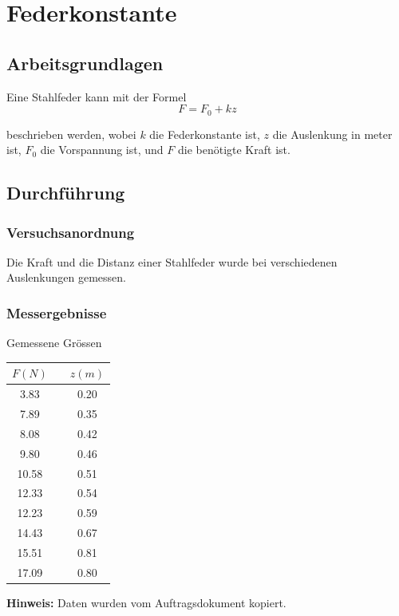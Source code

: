 \section{Federkonstante}

\subsection{Arbeitsgrundlagen}

Eine Stahlfeder kann mit der Formel
\begin{equation}
    F=F_0 + kz
    \label{eq:feder}
\end{equation}

beschrieben werden, wobei $k$ die Federkonstante ist, $z$ die Auslenkung in meter ist, $F_0$ die
Vorspannung ist, und $F$ die ben\"otigte Kraft ist.


\subsection{Durchf\"uhrung}

\subsubsection*{Versuchsanordnung}

Die Kraft und die Distanz einer Stahlfeder wurde bei verschiedenen Auslenkungen gemessen.


\subsubsection*{Messergebnisse}

\begin{center}
    \begin{threeparttable}
        \caption{Gemessene Gr\"ossen}
        \begin{tabular}{ccc}
            \toprule
            $F (N)$ & \hspace{12mm} & $z (m)$ \\
            \midrule
            3.83  & & 0.20 \\
            7.89  & & 0.35 \\
            8.08  & & 0.42 \\
            9.80  & & 0.46 \\
            10.58 & & 0.51 \\
            12.33 & & 0.54 \\
            12.23 & & 0.59 \\
            14.43 & & 0.67 \\
            15.51 & & 0.81 \\
            17.09 & & 0.80 \\
            \bottomrule
        \end{tabular}
        \begin{tablenotes}
            \small
            \item \textbf{Hinweis:} Daten wurden vom Auftragsdokument kopiert.
        \end{tablenotes}
        \label{tab:feder}
    \end{threeparttable}
\end{center}

